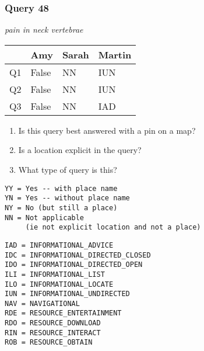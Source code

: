 \begin{frame}[fragile]
\frametitle{Query 48}
\vspace{1em}

\emph{pain in neck vertebrae}

\vfill

\begin{table}
  \centering
  \begin{tabular}{ l l l l }
    & \textbf{Amy} & \textbf{Sarah} & \textbf{Martin}\\
    \toprule
    Q1 & False & NN & IUN\\
Q2 & False & NN & IUN\\
Q3 & False & NN & IAD\\
    \bottomrule
  \end{tabular}
\end{table}

\vfill

\tiny{

\begin{enumerate}
\item Is this query best answered with a pin on a map?
\item Is a location explicit in the query?
\item What type of query is this?
\end{enumerate}

\vfill

\begin{multicols}{2}
\begin{verbatim}
YY = Yes -- with place name
YN = Yes -- without place name
NY = No (but still a place)
NN = Not applicable 
     (ie not explicit location and not a place)
\end{verbatim}

\columnbreak
\begin{verbatim}
IAD = INFORMATIONAL_ADVICE
IDC = INFORMATIONAL_DIRECTED_CLOSED
IDO = INFORMATIONAL_DIRECTED_OPEN
ILI = INFORMATIONAL_LIST
ILO = INFORMATIONAL_LOCATE
IUN = INFORMATIONAL_UNDIRECTED
NAV = NAVIGATIONAL
RDE = RESOURCE_ENTERTAINMENT
RDO = RESOURCE_DOWNLOAD
RIN = RESOURCE_INTERACT
ROB = RESOURCE_OBTAIN
\end{verbatim}
\end{multicols}
}

\end{frame}
